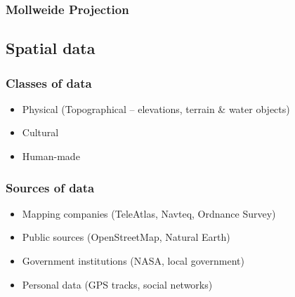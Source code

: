 \documentclass[17pt]{beamer}
\begin{document}
\begin{frame}
  \frametitle{Mollweide Projection}
\end{frame}

\subsection{Spatial data}

\begin{frame}
  \frametitle{Classes of data}
  \begin{itemize}
  \item Physical (Topographical -- elevations, terrain \& water objects)
  \item Cultural
  \item Human-made
  \end{itemize}
\end{frame}

\begin{frame}
  \frametitle{Sources of data}
  \begin{itemize}
  \item Mapping companies (TeleAtlas, Navteq, Ordnance Survey)
  \item Public sources (OpenStreetMap, Natural Earth)
  \item Government institutions (NASA, local government)
  \item Personal data (GPS tracks, social networks)
  \end{itemize}
\end{frame}
\end{document}

